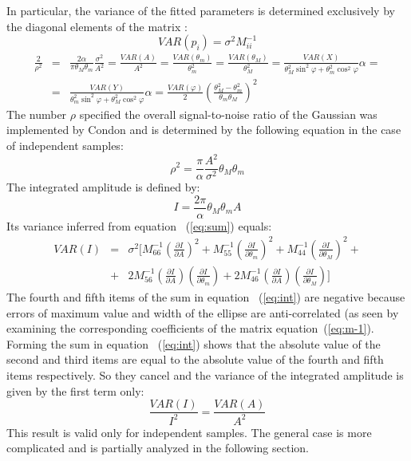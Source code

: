 In particular, the variance of the fitted parameters is determined
exclusively by the diagonal elements of the matrix :
\begin{equation}
VAR(p_i) = \sigma ^2 M_{ii}^{-1}
\end{equation}
\begin{eqnarray}
\frac{2}{\rho^2} & = &
\frac{2\alpha}{\pi\theta_M \theta_m}\frac{\sigma^2}{A^2}  = \frac{VAR (A)}{A^2} =
\frac{VAR (\theta_m)}{\theta_m^2} =\frac{VAR (\theta_M)}{\theta_M^2} =
\frac{VAR (X)}{ \theta_M^2 \sin^2 \varphi + \theta_m^2 \cos^2 \varphi}\alpha =
\nonumber \\
& = &
\frac{VAR (Y)}{ \theta_m^2 \sin^2 \varphi + \theta_M^2 \cos^2 \varphi}\alpha  =
\frac{VAR (\varphi)}{2} \left( \frac{\theta_M^2 - \theta_m^2}{\theta_m \theta_M}
\right)^2
\label{eq:ro}
\end{eqnarray}
The number $\rho$ specified the overall signal-to-noise ratio of the
Gaussian was implemented by Condon \cite{jjcon} and is determined by
the following equation in the case of independent samples:
\begin{equation}
\rho^2 = \frac{\pi}{\alpha} \frac{A^2}{\sigma^2} \theta_M \theta_m
\end{equation}
The integrated amplitude is defined by:
\begin{equation}
I = \frac{2\pi}{\alpha} \theta_M \theta_m A
\end{equation}
Its variance inferred from equation~ (\ref{eq:sum}) equals:
\begin{eqnarray}
VAR(I) &=& \sigma^2 [ M_{66}^{-1}\left(\frac{\partial I}{\partial A}\right)^2
+ M_{55}^{-1}\left(\frac{\partial I}{\partial \theta_m}\right)^2
+ M_{44}^{-1}\left(\frac{\partial I}{\partial \theta_M}\right)^2 +\nonumber
\\
&+& 2 M_{56}^{-1}\left(\frac{\partial I}{\partial A}\right)
\left(\frac{\partial I}{\partial \theta_m}\right) +
2 M_{46}^{-1}\left(\frac{\partial I}{\partial A}\right)
\left(\frac{\partial I}{\partial \theta_M}\right)
]
\label{eq:int}
\end{eqnarray}
The fourth and fifth items of the sum in equation~ (\ref{eq:int}) are
negative because errors of maximum value and width of the ellipse are
anti-correlated (as seen by examining the corresponding coefficients
of the matrix equation~(\ref{eq:m-1}). Forming the sum in equation~
(\ref{eq:int}) shows that the absolute value of the second and third
items  are equal to the absolute value of the fourth and fifth items
respectively. So they cancel and the variance of the integrated
amplitude is given by the first term only:
\begin{equation}
\frac{VAR(I)}{I^2} = \frac{VAR(A)}{A^2}
\label{eq:inti}
\end{equation}
This result is valid only for independent samples.  The general case
is more complicated and is partially analyzed in the following
section.
